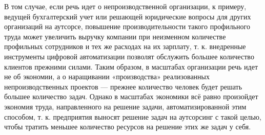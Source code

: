 \documentclass{article}
\begin{document}
В том случае, если речь идет о непроизводственной организации, к примеру, ведущей бухгалтерский учет или решающей юридические вопросы для других организаций на аутсорсе, повышение производительности такого профильного труда может увеличить выручку компании при неизменном количестве профильных сотрудников и тех же расходах на их зарплату, т. к. внедренные инструменты цифровой автоматизации позволят обслужить большее количество клиентов прежними силами. Таким образом, в масштабах организации речь идет не об экономии, а о наращивании «производства» реализованных непроизводственных проектов — прежнее количество человек будет решать большее количество задач. Однако в масштабах экономики всё равно произойдет экономия труда, направленного на решение задачи, автоматизированной этим способом, т. к. предприятия выносят решение задач на аутсорсинг с такой целью, чтобы тратить меньшее количество ресурсов на решение этих же задач у себя.
\end{document}
